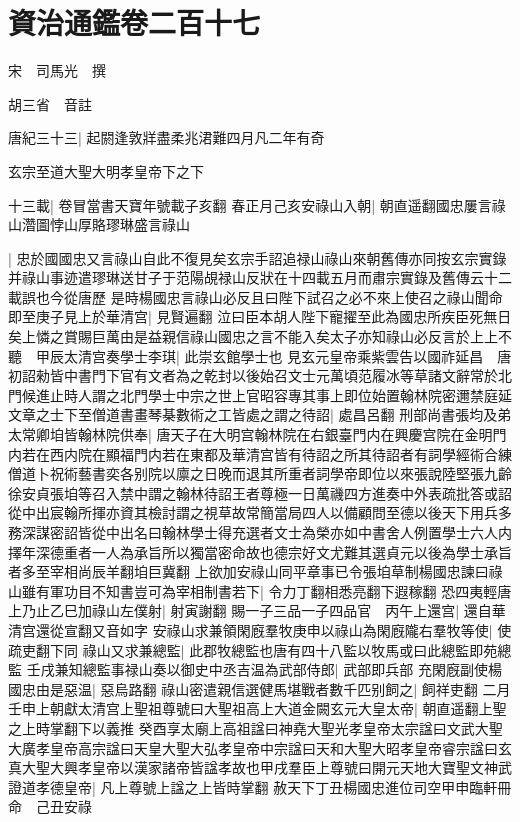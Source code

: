 \section{資治通鑑卷二百十七}
宋　司馬光　撰

胡三省　音註

唐紀三十三|{
	起閼逢敦牂盡柔兆涒難四月凡二年有奇}


玄宗至道大聖大明孝皇帝下之下

十三載|{
	卷冒當書天寶年號載子亥翻}
春正月己亥安祿山入朝|{
	朝直遥翻國忠屢言祿山濳圖悖山厚賂璆琳盛言祿山}


|{
	忠於國國忠又言祿山自此不復見矣玄宗手詔追禄山祿山來朝舊傳亦同按玄宗實錄并祿山事迹遣璆琳送甘子于范陽覘禄山反狀在十四載五月而肅宗實錄及舊傳云十二載誤也今從唐歷}
是時楊國忠言祿山必反且曰陛下試召之必不來上使召之祿山聞命即至庚子見上於華清宫|{
	見賢遍翻}
泣曰臣本胡人陛下寵擢至此為國忠所疾臣死無日矣上憐之賞賜巨萬由是益親信祿山國忠之言不能入矣太子亦知祿山必反言於上上不聽　甲辰太清宫奏學士李琪|{
	此崇玄館學士也}
見玄元皇帝乘紫雲告以國祚延昌　唐初詔勑皆中書門下官有文者為之乾封以後始召文士元萬頃范履冰等草諸文辭常於北門候進止時人謂之北門學士中宗之世上官昭容專其事上即位始置翰林院密邇禁庭延文章之士下至僧道書畫琴棊數術之工皆處之謂之待詔|{
	處昌呂翻}
刑部尚書張均及弟太常卿垍皆翰林院供奉|{
	唐天子在大明宫翰林院在右銀臺門内在興慶宫院在金明門内若在西内院在顯福門内若在東都及華清宫皆有待詔之所其待詔者有詞學經術合練僧道卜祝術藝書奕各别院以廪之日晚而退其所重者詞學帝即位以來張說陸堅張九齡徐安貞張垍等召入禁中謂之翰林待詔王者尊極一日萬禨四方進奏中外表疏批答或詔從中出宸翰所揮亦資其檢討謂之視草故常簡當局四人以備顧問至德以後天下用兵多務深謀密詔皆從中出名曰翰林學士得充選者文士為榮亦如中書舍人例置學士六人内擇年深德重者一人為承旨所以獨當密命故也德宗好文尤難其選貞元以後為學士承旨者多至宰相尚辰羊翻垍巨冀翻}
上欲加安祿山同平章事已令張垍草制楊國忠諫曰祿山雖有軍功目不知書豈可為宰相制書若下|{
	令力丁翻相悉亮翻下遐稼翻}
恐四夷輕唐上乃止乙巳加祿山左僕射|{
	射寅謝翻}
賜一子三品一子四品官　丙午上還宫|{
	還自華清宫還從宣翻又音如字}
安祿山求兼領閑廐羣牧庚申以祿山為閑廐隴右羣牧等使|{
	使疏吏翻下同}
祿山又求兼總監|{
	此郡牧總監也唐有四十八監以牧馬或曰此總監即苑總監}
壬戌兼知總監事禄山奏以御史中丞吉温為武部侍郎|{
	武部即兵部}
充閑廐副使楊國忠由是惡温|{
	惡烏路翻}
祿山密遣親信選健馬堪戰者數千匹别飼之|{
	飼祥吏翻}
二月壬申上朝獻太清宫上聖祖尊號曰大聖祖高上大道金闕玄元大皇太帝|{
	朝直遥翻上聖之上時掌翻下以義推}
癸酉享太廟上高祖諡曰神堯大聖光孝皇帝太宗諡曰文武大聖大廣孝皇帝高宗諡曰天皇大聖大弘孝皇帝中宗諡曰天和大聖大昭孝皇帝睿宗諡曰玄真大聖大興孝皇帝以漢家諸帝皆諡孝故也甲戌羣臣上尊號曰開元天地大寶聖文神武證道孝德皇帝|{
	凡上尊號上諡之上皆時掌翻}
赦天下丁丑楊國忠進位司空甲申臨軒冊命　己丑安祿

